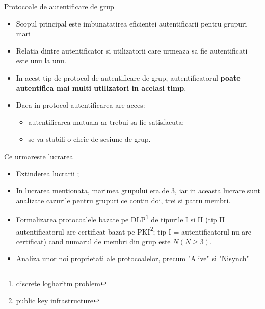 \documentclass[11pt]{beamer}
\begin{document}
\begin{frame}{Protocoale de autentificare de grup}

\begin{itemize}
\item Scopul principal este imbunatatirea eficientei autentificarii pentru grupuri mari
\item Relatia dintre autentificator si utilizatorii care urmeaza sa fie autentificati este unu la unu.
\item In acest tip de protocol de autentificare de grup, autentificatorul \textbf{poate autentifica mai multi utilizatori in acelasi timp}.
\item Daca in protocol autentificarea are acces:
\begin{itemize}
	\item autentificarea mutuala ar trebui sa fie satisfacuta;
	\item se va stabili o cheie de sesiune de grup.
\end{itemize}
\end{itemize}

\end{frame}

\begin{frame}{Ce urmareste lucrarea}

\begin{itemize}

\item Extinderea lucrarii \cite{fagrauth};
\item In lucrarea mentionata, marimea grupului era de 3, iar in aceasta lucrare sunt analizate cazurile pentru grupuri ce contin doi, trei si patru membri.
\item Formalizarea protocoalele bazate pe DLP\footnote{discrete logharitm problem} de tipurile I si II (tip II = autentificatorul are certificat bazat pe PKI\footnote{public key infrastructure}; tip I = autentificatorul nu are certificat) cand numarul de membri din grup este $N(N\geq3)$.
\item Analiza unor noi proprietati ale protocoalelor, precum "Alive" si "Nisynch"

\end{itemize}

\end{frame}
\end{document}
